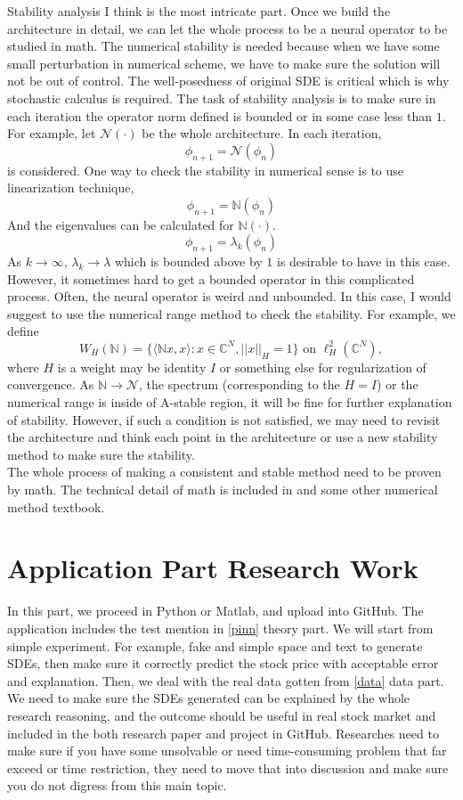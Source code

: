 \documentclass[12pt]{article}
\begin{document}
Stability analysis I think is the most intricate part. Once we build the architecture in detail, we can let the whole process to be a neural operator to be studied in math. The numerical stability is needed because when we have some small perturbation in numerical scheme, we have to make sure the solution will not be out of control. The well-posedness of original SDE is critical which is why stochastic calculus is required. The task of stability analysis is to make sure in each iteration the operator norm defined is bounded or in some case less than $1$. For example, let $\mathscr{N}(\cdot)$ be the whole architecture. In each iteration, 
\[
\phi_{n+1}=\mathscr{N}(\phi_n)
\]
is considered. One way to check the stability in numerical sense is to use linearization technique,
\[
\phi_{n+1}=\mathbb{N}(\phi_n)
\]
And the eigenvalues can be calculated for $\mathbb{N}(\cdot)$. 
\[
\phi_{n+1}=\lambda_k(\phi_n)
\]
As $k\to \infty$, $\lambda_k \to \lambda$ which is bounded above by $1$ is desirable to have in this case. However, it sometimes hard to get a bounded operator in this complicated process. Often, the neural operator is weird and unbounded. In this case, I would suggest to use the numerical range method to check the stability. For example, we define
\[
W_H (\mathbb{N})=\{\langle \mathbb{N}x,x\rangle: x\in \mathbb{C}^N, ||x||_H=1\} \text{ on } \ell_{H}^2 (\mathbb{C}^N),
\]
where $H$ is a weight may be identity $I$ or something else for regularization of convergence. As $\mathbb{N} \to \mathscr{N}$, the spectrum (corresponding to the $H=I$) or the numerical range is inside of A-stable region, it will be fine for further explanation of stability. However, if such a condition is not satisfied, we may need to revisit the architecture and think each point in the architecture or use a new stability method to make sure the stability. \\

The whole process of making a consistent and stable method need to be proven by math. The technical detail of math is included in \citet{e2019applied} and some other numerical method textbook. 

\section{Application Part Research Work}
In this part, we proceed in Python or Matlab, and upload into GitHub. The application includes the test mention in \ref{pinn} theory part. We will start from simple experiment. For example, fake and simple space and text to generate SDEs, then make sure it correctly predict the stock price with acceptable error and explanation. Then, we deal with the real data gotten from \ref{data} data part. We need to make sure the SDEs generated can be explained by the whole research reasoning, and the outcome should be useful in real stock market and included in the both research paper and project in GitHub. Researches need to make sure if you have some unsolvable or need time-consuming problem that far exceed or time restriction, they need to move that into discussion and make sure you do not digress from this main topic. 




\end{document}

